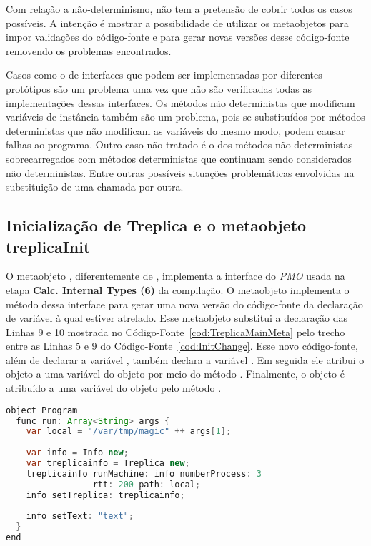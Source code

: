 Com relação a não-determinismo,  não tem a pretensão de cobrir todos os casos possíveis. A intenção é mostrar a possibilidade de utilizar os metaobjetos para impor validações do código-fonte e para gerar novas versões desse código-fonte removendo os problemas encontrados.

Casos como o de interfaces que podem ser implementadas por diferentes protótipos são um problema uma vez que não são verificadas todas as implementações dessas interfaces. Os métodos não deterministas que modificam variáveis de instância também são um problema, pois se substituídos por métodos deterministas que não modificam as variáveis do mesmo modo, podem causar falhas ao programa. Outro caso não tratado é o dos métodos não deterministas sobrecarregados com métodos deterministas que continuam sendo considerados não deterministas. Entre outras possíveis situações problemáticas envolvidas na substituição de uma chamada por outra.

\subsection{Inicialização de Treplica e o metaobjeto \textbf{treplicaInit}}
\label{sec:trcyndmetainitsec} 

O metaobjeto , diferentemente de , implementa a interface  do \emph{PMO} usada na etapa \textbf{Calc. Internal Types (6)} da compilação. O metaobjeto implementa o método  dessa interface para gerar uma nova versão do código-fonte da declaração de variável à qual estiver atrelado. Esse metaobjeto substitui a declaração das Linhas 9 e 10 mostrada no Código-Fonte~\ref{cod:TreplicaMainMeta} pelo trecho entre as Linhas 5 e 9 do Código-Fonte~\ref{cod:InitChange}. Esse novo código-fonte, além de declarar a variável , também declara a variável . Em seguida ele atribui o objeto  a uma variável do objeto  por meio do método . Finalmente, o objeto  é atribuído a uma variável do objeto  pelo método .

\begin{lstlisting}[language=Java, caption={Protótipo \textbf{Program} modificado}, label={cod:InitChange}]
object Program 
  func run: Array<String> args {
    var local = "/var/tmp/magic" ++ args[1];
    
    var info = Info new;
    var treplicainfo = Treplica new;
    treplicainfo runMachine: info numberProcess: 3
                 rtt: 200 path: local;
    info setTreplica: treplicainfo;
    
    info setText: "text";
  }
end
\end{lstlisting}

